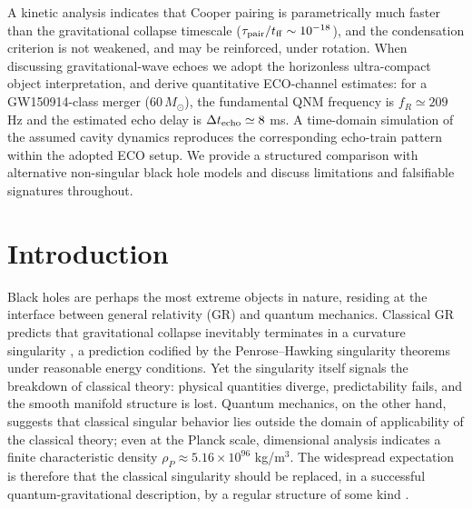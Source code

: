\documentclass[epj]{svjour}
\begin{document}
{A kinetic analysis indicates that Cooper pairing is parametrically much faster than the gravitational collapse timescale ($\tau_{\rm pair}/t_{\rm ff} \sim 10^{-18}$), and the condensation criterion is not weakened, and may be reinforced, under rotation. When discussing gravitational-wave echoes we adopt the horizonless ultra-compact object interpretation, and derive quantitative ECO-channel estimates: for a GW150914-class merger ($60\,M_\odot$), the fundamental QNM frequency is $f_R \simeq 209$ Hz and the estimated echo delay is $\Delta t_{\rm echo} \simeq 8$ ms. A time-domain simulation of the assumed cavity dynamics reproduces the corresponding echo-train pattern within the adopted ECO setup. We provide a structured comparison with alternative non-singular black hole models and discuss limitations and falsifiable signatures throughout.
%
} %

\maketitle

\section{Introduction}
\label{sec:intro}

Black holes are perhaps the most extreme objects in nature, residing at the interface between general relativity (GR) and quantum mechanics. Classical GR predicts that gravitational collapse inevitably terminates in a curvature singularity \cite{Penrose1965,HawkingEllis1973}, a prediction codified by the Penrose--Hawking singularity theorems under reasonable energy conditions. Yet the singularity itself signals the breakdown of classical theory: physical quantities diverge, predictability fails, and the smooth manifold structure is lost. Quantum mechanics, on the other hand, suggests that classical singular behavior lies outside the domain of applicability of the classical theory; even at the Planck scale, dimensional analysis indicates a finite characteristic density $\rho_P \approx 5.16 \times 10^{96}$ kg/m$^3$. The widespread expectation is therefore that the classical singularity should be replaced, in a successful quantum-gravitational description, by a regular structure of some kind \cite{Bardeen1968,Dymnikova1992,Hayward2006,BambiModesto2013}.
\end{document}
